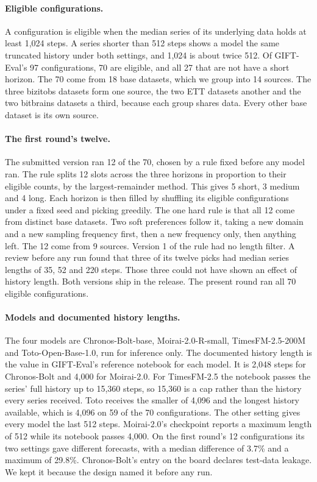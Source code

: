 \documentclass{article}
\begin{document}
\paragraph{Eligible configurations.} A configuration is eligible when the median series of its
underlying data holds at least 1,024 steps. A series shorter than 512 steps shows a model the
same truncated history under both settings, and 1,024 is about twice 512. Of GIFT-Eval's 97
configurations, 70 are eligible, and all 27 that are not have a short horizon. The 70 come from
18 base datasets, which we group into 14 sources. The three bizitobs datasets form one source,
the two ETT datasets another and the two bitbrains datasets a third, because each group shares
data. Every other base dataset is its own source.

\paragraph{The first round's twelve.} The submitted version ran 12 of the 70, chosen by a rule
fixed before any model ran. The rule splits 12 slots across the three horizons in proportion
to their eligible counts, by the largest-remainder method. This gives 5 short, 3 medium and 4
long. Each horizon is then filled by shuffling its eligible configurations under a fixed seed
and picking greedily. The one hard rule is that all 12 come from distinct base datasets. Two
soft preferences follow it, taking a new domain and a new sampling frequency first, then a new
frequency only, then anything left. The 12 come from 9 sources. Version 1 of the rule had no
length filter. A review before any run found that three of its twelve picks had median series
lengths of 35, 52 and 220 steps. Those three could not have shown an effect of history
length. Both versions ship in the release. The present round ran all 70 eligible
configurations.

\paragraph{Models and documented history lengths.} The four models are Chronos-Bolt-base,
Moirai-2.0-R-small, TimesFM-2.5-200M and Toto-Open-Base-1.0, run for inference only. The
documented history length is the value in GIFT-Eval's reference notebook for each model. It is
2,048 steps for Chronos-Bolt and 4,000 for Moirai-2.0. For TimesFM-2.5 the notebook passes the
series' full history up to 15,360 steps, so 15,360 is a cap rather than the history every
series received. Toto receives the smaller of 4,096 and the longest history available, which is
4,096 on 59 of the 70 configurations. The other setting gives every model the last 512 steps.
Moirai-2.0's checkpoint reports a maximum length of 512 while its notebook passes 4,000. On the
first round's 12 configurations its two settings gave different forecasts, with a median
difference of 3.7\% and a maximum of 29.8\%. Chronos-Bolt's entry on the board declares
test-data leakage. We kept it because the design named it before any run.
\end{document}
